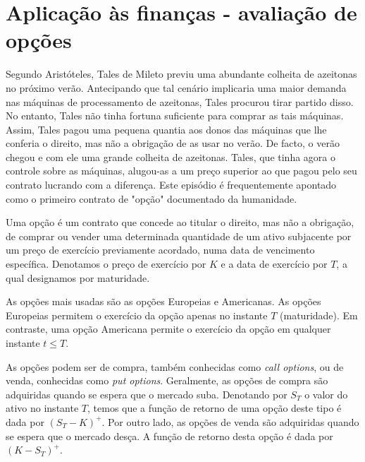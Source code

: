 \documentclass{article}
\begin{document}
\section{Aplicação às finanças - avaliação de opções }

\hspace{0.4cm} Segundo Aristóteles, Tales de Mileto previu uma abundante colheita de azeitonas no próximo verão. Antecipando que tal cenário implicaria uma maior demanda nas máquinas de processamento de azeitonas, Tales procurou tirar partido disso. No entanto, Tales não tinha fortuna suficiente para comprar as tais máquinas. Assim, Tales pagou uma pequena quantia aos donos das máquinas que lhe conferia o direito, mas não a obrigação de as usar no verão. De facto, o verão chegou e com ele uma grande colheita de azeitonas. Tales, que tinha agora o controle sobre as máquinas, alugou-as a um preço superior ao que pagou pelo seu contrato lucrando com a diferença. Este episódio é frequentemente apontado como o primeiro contrato de "opção" documentado da humanidade.

\vspace{0.2cm}

Uma opção é um contrato que concede ao titular o direito, mas não a obrigação, de comprar ou vender uma determinada quantidade de um ativo subjacente por um preço de exercício previamente acordado, numa data de vencimento específica. Denotamos o preço de exercício por $K$ e a data de exercício por $T$, a qual designamos por maturidade.

\vspace{0.2cm}

As opções mais usadas são as opções Europeias e Americanas. As opções Europeias permitem o exercício da opção apenas no instante $T$ (maturidade). Em contraste, uma opção Americana permite o exercício da opção em qualquer instante $t \leq T$.

\vspace{0.2cm}

As opções podem ser de compra, também conhecidas como \textit{call options}, ou de venda, conhecidas como \textit{put options}.
Geralmente, as opções de compra são adquiridas quando se espera que o mercado suba. Denotando por $S_T$ o valor do ativo no instante $T$, temos que a função de retorno de uma opção deste tipo é dada por $(S_T-K)^+$. Por outro lado, as opções de venda são adquiridas quando se espera que o mercado desça. A função de retorno desta opção é dada por $(K-S_T)^+$.

\vspace{0.5cm}
\end{document}
